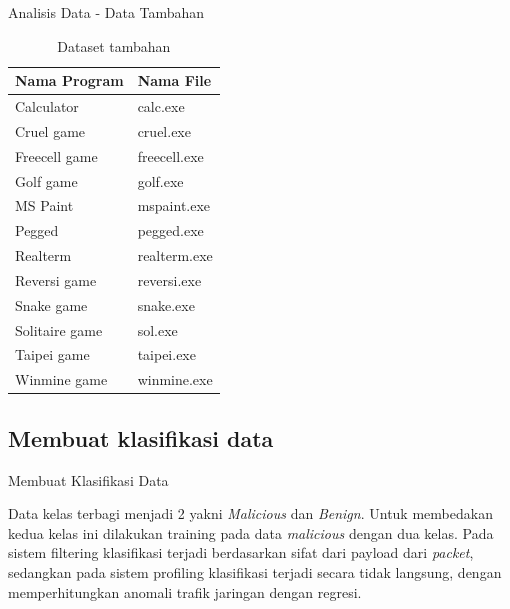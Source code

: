 \documentclass[t]{beamer}
\begin{document}
\begin{frame}{Analisis Data - Data Tambahan}
	\begin{table}[H]
		\centering
		\begin{tabularx}{0.5\textwidth}{|l|X|}
			\hline
			\textbf{Nama Program} & \textbf{Nama File} \\
			\hline
			Calculator            & calc.exe           \\
			\hline
			Cruel game            & cruel.exe          \\
			\hline
			Freecell game         & freecell.exe       \\
			\hline
			Golf game             & golf.exe           \\
			\hline
			MS Paint              & mspaint.exe        \\
			\hline
			Pegged                & pegged.exe         \\
			\hline
			Realterm              & realterm.exe       \\
			\hline
			Reversi game          & reversi.exe        \\
			\hline
			Snake game            & snake.exe          \\
			\hline
			Solitaire game        & sol.exe            \\
			\hline
			Taipei game           & taipei.exe         \\
			\hline
			Winmine game          & winmine.exe        \\
			\hline
		\end{tabularx}
		\caption{Dataset tambahan}
		\label{table:dataset_tambahan}
	\end{table}
\end{frame}
\subsection{Membuat klasifikasi data}
\begin{frame}{Membuat Klasifikasi Data}
	\par Data kelas terbagi menjadi 2 yakni \textit{Malicious} dan \textit{Benign}. Untuk membedakan kedua kelas ini dilakukan training pada data \textit{malicious} dengan dua kelas. Pada sistem filtering klasifikasi terjadi berdasarkan sifat dari payload dari \textit{packet}, sedangkan pada sistem profiling klasifikasi terjadi secara tidak langsung, dengan memperhitungkan anomali trafik jaringan dengan regresi.
\end{frame}
\end{document}
